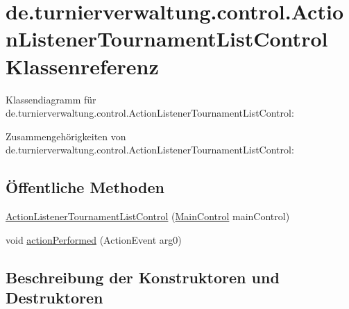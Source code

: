 \hypertarget{classde_1_1turnierverwaltung_1_1control_1_1_action_listener_tournament_list_control}{}\section{de.\+turnierverwaltung.\+control.\+Action\+Listener\+Tournament\+List\+Control Klassenreferenz}
\label{classde_1_1turnierverwaltung_1_1control_1_1_action_listener_tournament_list_control}


Klassendiagramm für de.\+turnierverwaltung.\+control.\+Action\+Listener\+Tournament\+List\+Control\+:


Zusammengehörigkeiten von de.\+turnierverwaltung.\+control.\+Action\+Listener\+Tournament\+List\+Control\+:
\subsection*{Öffentliche Methoden}
\begin{DoxyCompactItemize}
\item 
\hyperlink{classde_1_1turnierverwaltung_1_1control_1_1_action_listener_tournament_list_control_a763399525d47cbb8281f53d1b756dd1b}{Action\+Listener\+Tournament\+List\+Control} (\hyperlink{classde_1_1turnierverwaltung_1_1control_1_1_main_control}{Main\+Control} main\+Control)
\item 
void \hyperlink{classde_1_1turnierverwaltung_1_1control_1_1_action_listener_tournament_list_control_a8ce38268b3d77e5b9c89cbfa066ab9db}{action\+Performed} (Action\+Event arg0)
\end{DoxyCompactItemize}


\subsection{Beschreibung der Konstruktoren und Destruktoren}
